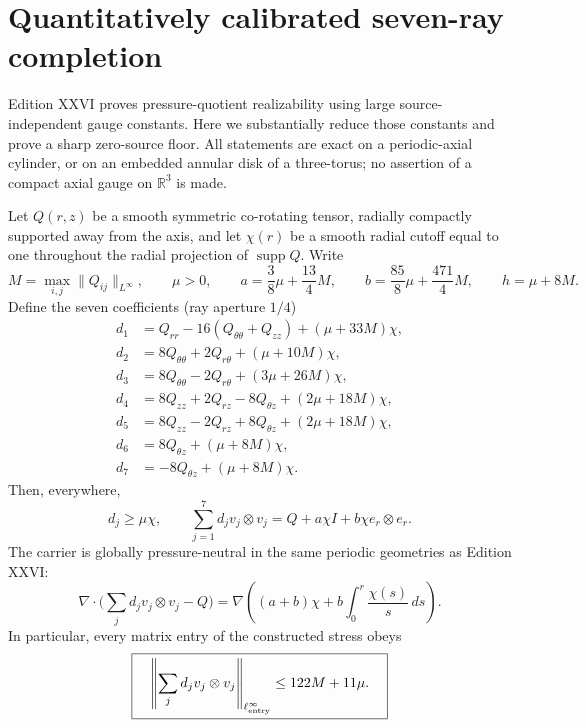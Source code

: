 
\section{Quantitatively calibrated seven-ray completion}
\label{sec:xxvii-calibrated}

Edition XXVI proves pressure-quotient realizability using large
source-independent gauge constants. Here we substantially reduce
those constants and prove a sharp zero-source floor. All statements
are exact on a periodic-axial cylinder, or on an embedded annular
disk of a three-torus; no assertion of a compact axial gauge on
$\mathbb R^3$ is made.

\begin{theorem}
\label{thm:xxvii-universal}
Let $Q(r,z)$ be a smooth symmetric co-rotating tensor, radially
compactly supported away from the axis, and let $\chi(r)$ be a
smooth radial cutoff equal to one throughout the radial
projection of $\operatorname{supp}Q$. Write
\[
M=\max_{i,j}\|Q_{ij}\|_{L^\infty},\qquad
\mu>0,\qquad
a=\frac{3}{8}\mu+\frac{13}{4}M,\qquad
b=\frac{85}{8}\mu+\frac{471}{4}M,\qquad
h=\mu+8M.
\]
Define the seven coefficients (ray aperture $1/4$)
\begin{align*}
d_1&=Q_{rr}-16(Q_{\theta\theta}+Q_{zz})
          +(\mu+33M)\chi,\\
d_2&=8Q_{\theta\theta}+2Q_{r\theta}
          +(\mu+10M)\chi,\\
d_3&=8Q_{\theta\theta}-2Q_{r\theta}
          +(3\mu+26M)\chi,\\
d_4&=8Q_{zz}+2Q_{rz}-8Q_{\theta z}
          +(2\mu+18M)\chi,\\
d_5&=8Q_{zz}-2Q_{rz}+8Q_{\theta z}
          +(2\mu+18M)\chi,\\
d_6&=8Q_{\theta z}+(\mu+8M)\chi,\\
d_7&=-8Q_{\theta z}+(\mu+8M)\chi.
\end{align*}
Then, everywhere,
\begin{equation}\label{eq:xxvii-completion}
\boxed{\quad
d_j\ge\mu\chi,\qquad
\sum_{j=1}^7d_jv_j\otimes v_j
=Q+a\chi I+b\chi e_r\otimes e_r.\quad}
\end{equation}
The carrier is globally pressure-neutral in the same periodic
geometries as Edition XXVI:
\[
\nabla\cdot\bigl(\sum_jd_jv_j\otimes v_j-Q\bigr)
=\nabla\left((a+b)\chi+
  b\int_0^r\frac{\chi(s)}s\,ds\right).
\]
In particular, every matrix entry of the constructed stress obeys
\begin{equation}\label{eq:xxvii-size}
\boxed{\quad
\left\|\sum_jd_jv_j\otimes v_j\right\|_{\ell^\infty_{\rm entry}}
\le122M+11\mu.\quad}
\end{equation}
\end{theorem}
